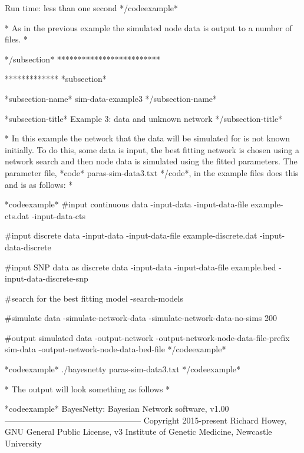 Run time: less than one second */codeexample*

* As in the previous example the simulated node data is output to a number of files. *

*/subsection* *************************

************* *subsection*

*subsection-name* sim-data-example3 */subsection-name*

*subsection-title* Example 3: data and unknown network */subsection-title*

* In this example the network that the data will be simulated for is not known initially. To do this, some data is input, the best fitting network is chosen using a network search and then node data is simulated using the fitted parameters. The parameter file, *code* paras-sim-data3.txt */code*, in the example files does this and is as follows: *

*codeexample* #input continuous data -input-data -input-data-file example-cts.dat -input-data-cts

#input discrete data -input-data -input-data-file example-discrete.dat -input-data-discrete

#input SNP data as discrete data -input-data -input-data-file example.bed -input-data-discrete-snp

#search for the best fitting model -search-models

#simulate data -simulate-network-data -simulate-network-data-no-sims 200

#output simulated data -output-network -output-network-node-data-file-prefix sim-data -output-network-node-data-bed-file */codeexample*


*codeexample* ./bayesnetty paras-sim-data3.txt */codeexample*

* The output will look something as follows *

*codeexample* BayesNetty: Bayesian Network software, v1.00 -------------------------------------------------- Copyright 2015-present Richard Howey, GNU General Public License, v3 Institute of Genetic Medicine, Newcastle University

